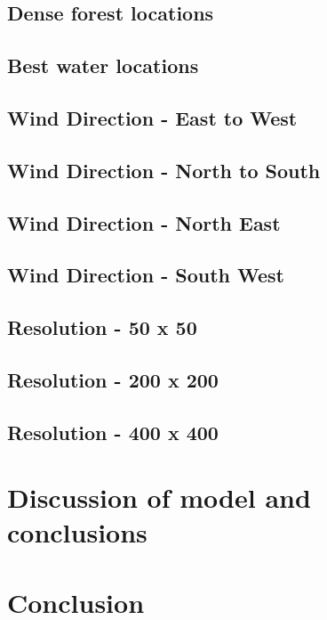 \documentclass[11pt, a4paper, titlepage]{article}
\begin{document}
  \subsection{Dense forest locations}
  \subsection{Best water locations}
  \subsection{Wind Direction - East to West}
  \subsection{Wind Direction - North to South}
  \subsection{Wind Direction - North East}
  \subsection{Wind Direction - South West}
  \subsection{Resolution     -  50 x  50}
  \subsection{Resolution     - 200 x 200}
  \subsection{Resolution     - 400 x 400}
\newpage
\section{Discussion of model and conclusions} 
\section{Conclusion}

\newpage
\renewcommand{\bibname}{Bibliography}


\end{document}
